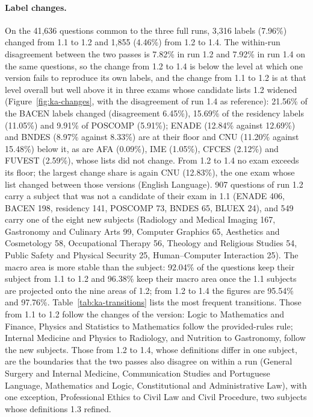 \paragraph{Label changes.} On the 41,636 questions common to the three full
runs, 3,316 labels (7.96\%) changed from 1.1 to 1.2 and 1,855 (4.46\%) from
1.2 to 1.4. The within-run disagreement between the two passes is 7.82\% in
run 1.2 and 7.92\% in run 1.4 on the same questions, so the change from 1.2
to 1.4 is below the level at which one version fails to reproduce its own
labels, and the change from 1.1 to 1.2 is at that level overall but well
above it in three exams whose candidate lists 1.2 widened
(Figure~\ref{fig:ka-changes}, with the disagreement of run 1.4 as reference):
21.56\% of the BACEN labels changed (disagreement 6.45\%), 15.69\% of the
residency labels (11.05\%) and 9.91\% of POSCOMP (5.91\%); ENADE (12.84\%
against 12.69\%) and BNDES (8.97\% against 8.33\%) are at their floor and CNU
(11.20\% against 15.48\%) below it, as are AFA (0.09\%), IME (1.05\%), CFCES
(2.12\%) and FUVEST (2.59\%), whose lists did not change. From 1.2 to 1.4 no
exam exceeds its floor; the largest change share is again CNU (12.83\%), the
one exam whose list changed between those versions (English Language). 907 questions of run 1.2
carry a subject that was not a candidate of their exam in 1.1 (ENADE 406,
BACEN 198, residency 141, POSCOMP 73, BNDES 65, BLUEX 24), and 549 carry one
of the eight new subjects (Radiology and Medical Imaging 167, Gastronomy and
Culinary Arts 99, Computer Graphics 65, Aesthetics and Cosmetology 58,
Occupational Therapy 56, Theology and Religious Studies 54, Public Safety and
Physical Security 25, Human--Computer Interaction 25). The macro area is more
stable than the subject: 92.04\% of the questions keep their subject from
1.1 to 1.2 and 96.38\% keep their macro area once the 1.1 subjects are
projected onto the nine areas of 1.2; from 1.2 to 1.4 the figures are
95.54\% and 97.76\%. Table~\ref{tab:ka-transitions} lists the most frequent
transitions. Those from 1.1 to 1.2 follow the changes of the version: Logic to
Mathematics and Finance, Physics and Statistics to Mathematics follow the
provided-rules rule; Internal Medicine and Physics to Radiology, and Nutrition
to Gastronomy, follow the new subjects. Those from 1.2 to 1.4, whose
definitions differ in one subject, are the boundaries that the two passes
also disagree on within a run (General Surgery and Internal Medicine,
Communication Studies and Portuguese Language, Mathematics and Logic,
Constitutional and Administrative Law), with one exception, Professional Ethics
to Civil Law and Civil Procedure, two subjects whose definitions 1.3 refined.

